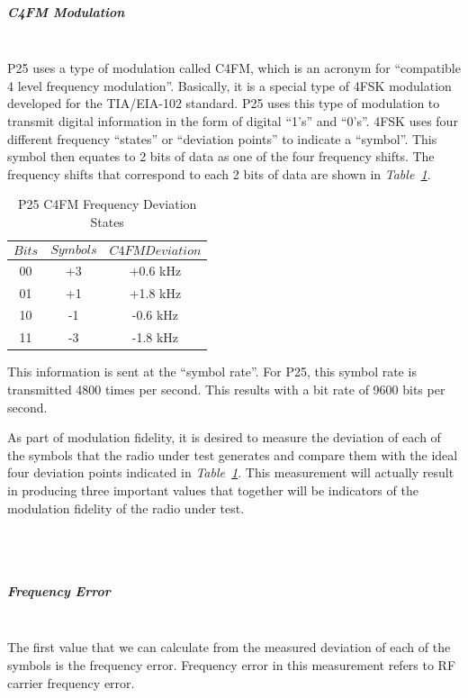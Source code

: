 \subparagraph{C4FM Modulation} \-\\
\- \indent
	P25 uses a type of modulation called C4FM, which is an acronym for “compatible 4 level frequency modulation”\cite{fidelity}. Basically, it is a special type of 4FSK modulation developed for the TIA/EIA-102 standard. P25 uses this type of modulation to transmit digital information in the form of digital “1’s” and “0’s”. 4FSK uses four different frequency “states” or “deviation points” to indicate a “symbol”. This symbol then equates to 2 bits of data as one of the four frequency shifts. The frequency shifts that correspond to each 2 bits of data are shown in \textit{Table~\ref{tab:modfide}}.
	
\begin{table}[H]
  \centering
 
    \begin{tabular}{c|c|c}
       $$Bits$$ & $$Symbols$$ & $$C4FM Deviation$$ \\ \hline
       00 & +3 & +0.6 kHz  \\ \hline
       01 & +1 & +1.8 kHz  \\ \hline
       10 & -1 & -0.6 kHz  \\ \hline
       11 & -3 & -1.8 kHz  
      
  \end{tabular}
  \caption{P25 C4FM Frequency Deviation States}
  \label{tab:modfide}
\end{table}

	This information is sent at the “symbol rate”. For P25, this symbol rate is transmitted 4800 times per second. This results  with a bit rate of 9600 bits per second. 
		
	As part of modulation fidelity, it is desired to measure the deviation of each of the symbols that the radio under test generates and compare them with the ideal four deviation points indicated in \textit{Table~\ref{tab:modfide}}. This measurement will actually result in producing three important values that together will be indicators of the modulation fidelity of the radio under test.

\- \\ \- \\

\subparagraph{Frequency Error} \- \\
\- \indent
	The first value that we can calculate from the measured deviation of each of the symbols is the frequency error. Frequency error in this measurement refers to RF carrier frequency error.
		
